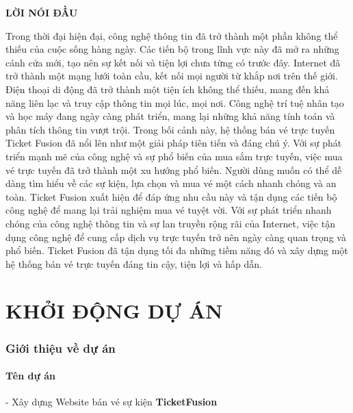 \documentclass[12pt]{article}
\begin{document}
\clearpage

\begin{center}
    \textbf{\fontsize{16}{20}\selectfont LỜI NÓI ĐẦU} \par
\end{center}
\vspace{2cm}
\hspace{1cm}Trong thời đại hiện đại, công nghệ thông tin đã trở thành một phần không thể thiếu của cuộc sống hàng ngày. Các tiến bộ trong lĩnh vực này đã mở ra những cánh cửa mới, tạo nên sự kết nối và tiện lợi chưa từng có trước đây. Internet đã trở thành một mạng lưới toàn cầu, kết nối mọi người từ khắp nơi trên thế giới. Điện thoại di động đã trở thành một tiện ích không thể thiếu, mang đến khả năng liên lạc và truy cập thông tin mọi lúc, mọi nơi. Công nghệ trí tuệ nhân tạo và học máy đang ngày càng phát triển, mang lại những khả năng tính toán và phân tích thông tin vượt trội. Trong bối cảnh này, hệ thống bán vé trực tuyến Ticket Fusion đã nổi lên như một giải pháp tiên tiến và đáng chú ý. Với sự phát triển mạnh mẽ của công nghệ và sự phổ biến của mua sắm trực tuyến, việc mua vé trực tuyến đã trở thành một xu hướng phổ biến. Người dùng muốn có thể dễ dàng tìm hiểu về các sự kiện, lựa chọn và mua vé một cách nhanh chóng và an toàn. Ticket Fusion xuất hiện để đáp ứng nhu cầu này và tận dụng các tiến bộ công nghệ để mang lại trải nghiệm mua vé tuyệt vời. Với sự phát triển nhanh chóng của công nghệ thông tin và sự lan truyền rộng rãi của Internet, việc tận dụng công nghệ để cung cấp dịch vụ trực tuyến trở nên ngày càng quan trọng và phổ biến. Ticket Fusion đã tận dụng tối đa những tiềm năng đó và xây dựng một hệ thống bán vé trực tuyến đáng tin cậy, tiện lợi và hấp dẫn.

\newpage

\part{KHỞI ĐỘNG DỰ ÁN}

\section{Giới thiệu về dự án}

\subsection{Tên dự án}
\hspace{1cm}- Xây dựng Website bán vé sự kiện \textbf{TicketFusion}
\end{document}
